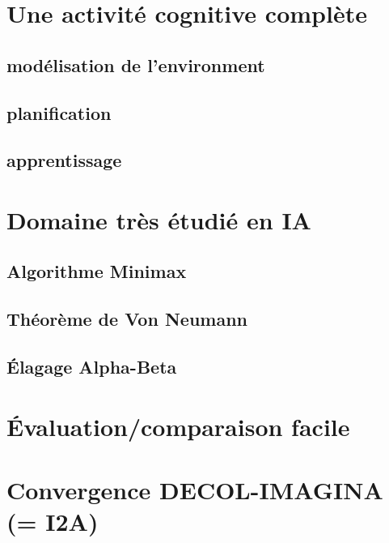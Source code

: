\section{Une activité cognitive complète}
\subsection{modélisation de l'environment}
\subsection{planification}
\subsection{apprentissage}

\section{Domaine très étudié en IA}
\subsection{Algorithme Minimax}
\subsection{Théorème de Von Neumann}
\subsection{Élagage Alpha-Beta}

\section{Évaluation/comparaison facile}

\section{Convergence DECOL-IMAGINA (= I2A) }